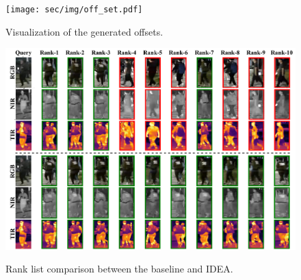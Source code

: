 \begin{figure}[t]
  \centering
    \resizebox{0.45\textwidth}{!}
    {
  \texttt{[image: sec/img/off\_set.pdf]}
  }
  \vspace{-2mm}
   \caption{Visualization of the generated offsets.}
  \label{fig:off_set}
  \vspace{-4mm}
\end{figure}
\begin{figure}[t]
  \centering
    \resizebox{0.45\textwidth}{!}
    {
  \includegraphics[width=30\linewidth]{sec/img/rank-list.pdf}
  }
  \vspace{-2mm}
   \caption{Rank list comparison between the baseline and IDEA.}
  \label{fig:rank_list}
  \vspace{-5mm}
\end{figure}
